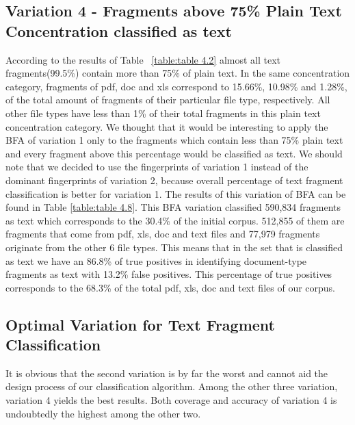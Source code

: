 \subsection{Variation 4 - Fragments above 75\% Plain Text Concentration classified as text} 
According to the results of Table  ~\ref{table:table 4.2} almost all text fragments(99.5\%) contain more than 75\% of plain text. In the same concentration category, fragments of pdf, doc and xls correspond to 15.66\%, 10.98\% and 1.28\%, of the total amount of fragments of their particular file type, respectively. All other file types have less than 1\% of their total fragments in this plain text concentration category. We thought that it would be interesting to apply the BFA of variation 1 only to the fragments which contain less than 75\% plain text and every fragment above this percentage would be classified as text. We should note that we decided to use the fingerprints of variation 1 instead of the dominant fingerprints of variation 2, because overall percentage of text fragment classification is better for variation 1. 
The results of this variation of BFA can be found in Table \ref{table:table 4.8}.
This BFA variation classified 590,834 fragments as text which corresponds to the 30.4\% of the initial corpus. 512,855 of them are fragments that come from pdf, xls, doc and text files and 77,979 fragments originate from the other 6 file types. This means that in the set that is classified as text we have an 86.8\% of true positives in identifying document-type fragments as text with 13.2\% false positives. This percentage of true positives corresponds to the 68.3\% of the total pdf, xls, doc and text files of our corpus.
  

\subsection{Optimal Variation for Text Fragment Classification}
It is obvious that the second variation is by far the worst and cannot aid the design process of our classification algorithm. Among the other three variation, variation 4 yields the best results. Both coverage and accuracy of variation 4 is undoubtedly the highest among the other two.

